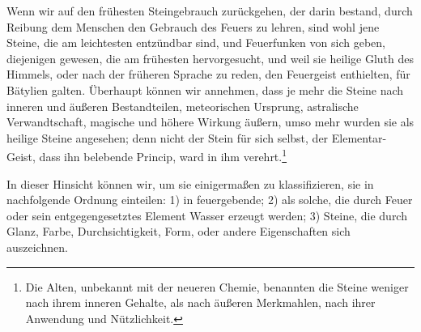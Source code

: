 \documentclass[a4paper, 11pt, oneside, polutonikogreek, german]{article}
\begin{document}
Wenn wir auf den frühesten Steingebrauch zurückgehen, der darin bestand, durch Reibung dem Menschen den Gebrauch des Feuers zu lehren, sind wohl jene Steine, die am leichtesten entzündbar sind, und Feuerfunken von sich geben, diejenigen gewesen, die am frühesten hervorgesucht, und weil sie heilige Gluth des Himmels, oder nach der früheren Sprache zu reden, den Feuergeist enthielten, für Bätylien galten. Überhaupt können wir annehmen, dass je mehr die Steine nach inneren und äußeren Bestandteilen, meteorischen Ursprung, astralische Verwandtschaft, magische und höhere Wirkung äußern, umso mehr wurden sie als heilige Steine angesehen; denn nicht der Stein für sich selbst, der Elementar-Geist, dass ihn belebende Princip, ward in ihm verehrt.\footnote{Die Alten, unbekannt mit der neueren Chemie, benannten die Steine weniger nach ihrem inneren Gehalte, als nach äußeren Merkmahlen, nach ihrer Anwendung und Nützlichkeit.}

In dieser Hinsicht können wir, um sie einigermaßen zu klassifizieren, sie in nachfolgende Ordnung einteilen: 1) in feuergebende; 2) als solche, die durch Feuer oder sein entgegengesetztes Element Wasser erzeugt werden; 3) Steine, die durch Glanz, Farbe, Durchsichtigkeit, Form, oder andere Eigenschaften sich auszeichnen.
\end{document}
